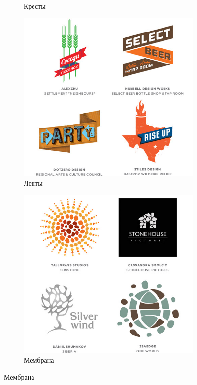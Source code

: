 \begin{figure}[h!]
\begin{subfigure}{.45\textwidth}
    \caption{Кресты}
    \label{fig:logolounge:2013:kresti}
  \end{subfigure}
  \vfill
  \centering
  \begin{subfigure}{.45\textwidth}
    \centering
    \includegraphics[width=\linewidth]{images/supplement/logolounge/2013/Lenti}
    \caption{Ленты}
    \label{fig:logolounge:2013:lenti}
  \end{subfigure}
  \hfill
  \centering
  \begin{subfigure}{.45\textwidth}
    \centering
    \includegraphics[width=\linewidth]{images/supplement/logolounge/2013/Membrana}
    \caption{Мембрана}
    \label{fig:logolounge:2013:membrana}
  \end{subfigure}
\end{figure}

